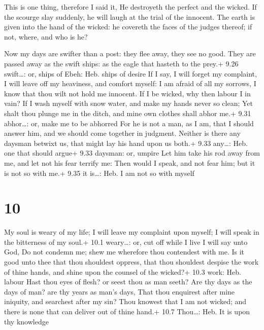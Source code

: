  This is one thing, therefore I said it, He destroyeth the
perfect and the wicked.  If the scourge slay suddenly, he
will laugh at the trial of the innocent.  The earth is
given into the hand of the wicked: he covereth the faces of the judges
thereof; if not, where, and who is he?

 Now my days are swifter than a post: they flee away, they
see no good.  They are passed away as the swift ships: as
the eagle that hasteth to the prey.+ 9.26 swift\ldots: or, ships of
Ebeh: Heb. ships of desire  If I say, I will forget my
complaint, I will leave off my heaviness, and comfort myself:
 I am afraid of all my sorrows, I know that thou wilt not
hold me innocent.  If I be wicked, why then labour I in
vain?  If I wash myself with snow water, and make my hands
never so clean;  Yet shalt thou plunge me in the ditch, and
mine own clothes shall abhor me.+ 9.31 abhor\ldots: or, make me to be
abhorred  For he is not a man, as I am, that I should
answer him, and we should come together in judgment. 
Neither is there any daysman betwixt us, that might lay his hand upon us
both.+ 9.33 any\ldots: Heb. one that should argue+ 9.33 daysman: or,
umpire  Let him take his rod away from me, and let not his
fear terrify me:  Then would I speak, and not fear him; but
it is not so with me.+ 9.35 it is\ldots: Heb. I am not so with myself

\hypertarget{section-9}{%
\section{10}\label{section-9}}

 My soul is weary of my life; I will leave my complaint upon
myself; I will speak in the bitterness of my soul.+ 10.1 weary\ldots:
or, cut off while I live  I will say unto God, Do not
condemn me; shew me wherefore thou contendest with me.  Is
it good unto thee that thou shouldest oppress, that thou shouldest
despise the work of thine hands, and shine upon the counsel of the
wicked?+ 10.3 work: Heb. labour  Hast thou eyes of flesh? or
seest thou as man seeth?  Are thy days as the days of man?
are thy years as man's days,  That thou enquirest after mine
iniquity, and searchest after my sin?  Thou knowest that I
am not wicked; and there is none that can deliver out of thine hand.+
10.7 Thou\ldots: Heb. It is upon thy knowledge

